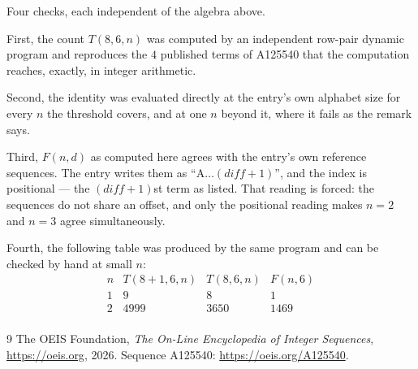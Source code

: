 \documentclass[11pt,a4paper]{article}
\theoremstyle{plain}
\theoremstyle{definition}
\begin{document}
Four checks, each independent of the algebra above.

First, the count $T(8,6,n)$ was computed by an independent row-pair dynamic program and
reproduces the $4$ published terms of A125540 that the computation reaches,
exactly, in integer arithmetic.

Second, the identity was evaluated directly at the entry's own alphabet size for every $n$ the
threshold covers, and at one $n$ beyond it, where it fails as the remark says.

Third, $F(n,d)$ as computed here agrees with the entry's own reference sequences. The entry
writes them as ``$\mathrm{A}\dots(\mathit{diff}+1)$'', and the index is positional --- the
$(\mathit{diff}+1)$st term as listed. That reading is forced: the sequences do not share an
offset, and only the positional reading makes $n=2$ and $n=3$ agree simultaneously.

Fourth, the following table was produced by the same program and can be checked by hand at
small $n$:
\[
\begin{array}{rrrr}
n & T(8+1,6,n) & T(8,6,n) & F(n,6) \\ \hline
1 & 9 & 8 & 1 \\
2 & 4999 & 3650 & 1469 \\
\end{array}
\]

\begin{thebibliography}{9}
 The OEIS Foundation, \emph{The On-Line Encyclopedia of Integer Sequences},
\url{https://oeis.org}, 2026. Sequence A125540: \url{https://oeis.org/A125540}.
\end{thebibliography}
\end{document}
